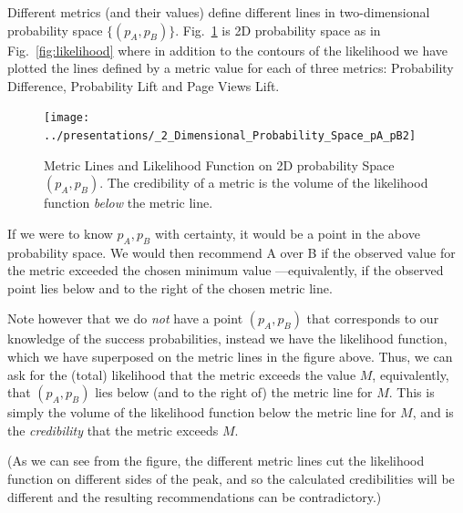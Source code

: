 \documentclass[letterpaper,12pt]{article}
\begin{document}
Different metrics (and their values) define different lines in
two-dimensional probability space \(\{(p_A, p_B)\}\). Fig.~\ref{fig:metric_likelihood} is 2D probability space as in Fig.~\ref{fig:likelihood} where in addition to the contours of the likelihood
we have plotted the lines defined by a metric value for each of three
metrics: Probability Difference, Probability Lift and Page Views Lift.
\begin{figure}[ht!]
\centering
\texttt{[image: ../presentations/\_2\_Dimensional\_Probability\_Space\_pA\_pB2]}
\caption{Metric Lines and Likelihood Function on 2D probability Space \((p_A, p_B)\). The credibility of a metric is the volume of the likelihood function {\em below} the metric line.\label{fig:metric_likelihood}}
\end{figure}

If we were to know \(p_A,p_B\) with certainty, it would be a point in the above probability space. We would then recommend A over B if the observed value for the metric exceeded the chosen minimum value ---equivalently, if the
observed point lies below and to the right of the chosen metric line.

Note however that we do {\em not} have a point
\((p_A,p_B)\) that corresponds to our knowledge of the success
probabilities, instead we have the likelihood function, which we have superposed on the metric lines in the figure above. Thus, we
can ask for the (total) likelihood that the metric exceeds the value \(M\), equivalently, that \((p_A,p_B)\) lies below (and
to the right of) the metric line for \(M\).
This is simply the volume of the
likelihood function below the metric line for \(M\), and is
the {\em credibility} that the metric exceeds \(M\).

(As we can see from the figure, the different metric lines cut the
likelihood function on different sides of the peak, and so the
calculated credibilities will be different and the resulting
recommendations can be contradictory.)
\end{document}
